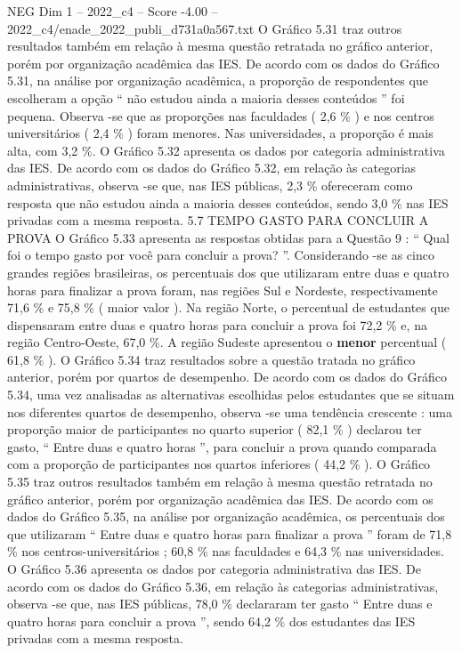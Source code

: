 \begin{textsample}{NEG Dim 1 – 2022\_c4 – Score -4.00 – 2022\_c4/enade\_2022\_publi\_d731a0a567.txt}
O Gráfico 5.31 traz outros resultados também em relação à mesma questão retratada no gráfico anterior, porém por organização acadêmica das IES.
De acordo com os dados do Gráfico 5.31, na análise por organização acadêmica, a proporção de respondentes que escolheram a opção “ não estudou ainda a maioria desses conteúdos ” foi pequena.
Observa -se que as proporções nas faculdades ( 2,6 \% ) e nos centros universitários ( 2,4 \% ) foram menores.
Nas universidades, a proporção é mais alta, com 3,2 \%.
O Gráfico 5.32 apresenta os dados por categoria administrativa das IES.
De acordo com os dados do Gráfico 5.32, em relação às categorias administrativas, observa -se que, nas IES públicas, 2,3 \% ofereceram como resposta que não estudou ainda a maioria desses conteúdos, sendo 3,0 \% nas IES privadas com a mesma resposta. 5.7 TEMPO GASTO PARA CONCLUIR A PROVA O Gráfico 5.33 apresenta as respostas obtidas para a Questão 9 : “ Qual foi o tempo gasto por você para concluir a prova? ”.
Considerando -se as cinco grandes regiões brasileiras, os percentuais dos que utilizaram entre duas e quatro horas para finalizar a prova foram, nas regiões Sul e Nordeste, respectivamente 71,6 \% e 75,8 \% ( maior valor ).
Na região Norte, o percentual de estudantes que dispensaram entre duas e quatro horas para concluir a prova foi 72,2 \% e, na região Centro-Oeste, 67,0 \%.
A região Sudeste apresentou o \textbf{menor} percentual ( 61,8 \% ).
O Gráfico 5.34 traz resultados sobre a questão tratada no gráfico anterior, porém por quartos de desempenho.
De acordo com os dados do Gráfico 5.34, uma vez analisadas as alternativas escolhidas pelos estudantes que se situam nos diferentes quartos de desempenho, observa -se uma tendência crescente : uma proporção maior de participantes no quarto superior ( 82,1 \% ) declarou ter gasto, “ Entre duas e quatro horas ”, para concluir a prova quando comparada com a proporção de participantes nos quartos inferiores ( 44,2 \% ).
O Gráfico 5.35 traz outros resultados também em relação à mesma questão retratada no gráfico anterior, porém por organização acadêmica das IES.
De acordo com os dados do Gráfico 5.35, na análise por organização acadêmica, os percentuais dos que utilizaram “ Entre duas e quatro horas para finalizar a prova ” foram de 71,8 \% nos centros-universitários ; 60,8 \% nas faculdades e 64,3 \% nas universidades.
O Gráfico 5.36 apresenta os dados por categoria administrativa das IES.
De acordo com os dados do Gráfico 5.36, em relação às categorias administrativas, observa -se que, nas IES públicas, 78,0 \% declararam ter gasto “ Entre duas e quatro horas para concluir a prova ”, sendo 64,2 \% dos estudantes das IES privadas com a mesma resposta.

\end{textsample}
